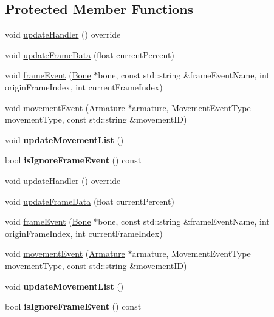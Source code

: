 \subsection*{Protected Member Functions}
\begin{DoxyCompactItemize}
\item 
void \hyperlink{classcocostudio_1_1ArmatureAnimation_ae2fd5441c69b5ac036116bbe548f5595}{update\+Handler} () override
\item 
void \hyperlink{classcocostudio_1_1ArmatureAnimation_ae4f82be17f0c1612d0d5fca27d8698dc}{update\+Frame\+Data} (float current\+Percent)
\item 
void \hyperlink{classcocostudio_1_1ArmatureAnimation_a5dc76e45a42c7e6f3f163554264e90c5}{frame\+Event} (\hyperlink{classcocostudio_1_1Bone}{Bone} $\ast$bone, const std\+::string \&frame\+Event\+Name, int origin\+Frame\+Index, int current\+Frame\+Index)
\item 
void \hyperlink{classcocostudio_1_1ArmatureAnimation_af4344e809d3081c651f6df125f8cf40d}{movement\+Event} (\hyperlink{classcocostudio_1_1Armature}{Armature} $\ast$armature, Movement\+Event\+Type movement\+Type, const std\+::string \&movement\+ID)
\item 
\mbox{\label{classcocostudio_1_1ArmatureAnimation_a57a4579595bf61437c457c1b47a8e214}} 
void {\bfseries update\+Movement\+List} ()
\item 
\mbox{\label{classcocostudio_1_1ArmatureAnimation_a7b74862eb956aacf8aecb716a82d4ee0}} 
bool {\bfseries is\+Ignore\+Frame\+Event} () const
\item 
void \hyperlink{classcocostudio_1_1ArmatureAnimation_ae2fd5441c69b5ac036116bbe548f5595}{update\+Handler} () override
\item 
void \hyperlink{classcocostudio_1_1ArmatureAnimation_ae4f82be17f0c1612d0d5fca27d8698dc}{update\+Frame\+Data} (float current\+Percent)
\item 
void \hyperlink{classcocostudio_1_1ArmatureAnimation_a5dc76e45a42c7e6f3f163554264e90c5}{frame\+Event} (\hyperlink{classcocostudio_1_1Bone}{Bone} $\ast$bone, const std\+::string \&frame\+Event\+Name, int origin\+Frame\+Index, int current\+Frame\+Index)
\item 
void \hyperlink{classcocostudio_1_1ArmatureAnimation_af4344e809d3081c651f6df125f8cf40d}{movement\+Event} (\hyperlink{classcocostudio_1_1Armature}{Armature} $\ast$armature, Movement\+Event\+Type movement\+Type, const std\+::string \&movement\+ID)
\item 
\mbox{\label{classcocostudio_1_1ArmatureAnimation_a57a4579595bf61437c457c1b47a8e214}} 
void {\bfseries update\+Movement\+List} ()
\item 
\mbox{\label{classcocostudio_1_1ArmatureAnimation_a7b74862eb956aacf8aecb716a82d4ee0}} 
bool {\bfseries is\+Ignore\+Frame\+Event} () const
\end{DoxyCompactItemize}
